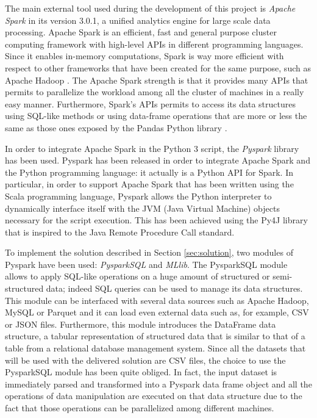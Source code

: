 The main external tool used during the development of this project is \textit{Apache Spark} \cite{spark-reference} in its version 3.0.1, a unified analytics engine for large scale data processing. Apache Spark is an efficient, fast and general purpose cluster computing framework with high-level APIs in different programming languages. Since it enables in-memory computations, Spark is way more efficient with respect to other frameworks that have been created for the same purpose, such as Apache Hadoop \cite{hadoop-reference}. The Apache Spark strength is that it provides many APIs that permits to parallelize the workload among all the cluster of machines in a really easy manner. Furthermore, Spark's APIs permits to access its data structures using SQL-like methods or using data-frame operations that are more or less the same as those ones exposed by the Pandas Python library \cite{python-pandas}.

In order to integrate Apache Spark in the Python 3 script, the \textit{Pyspark} library \cite{pyspark-reference} has been used. Pyspark has been released in order to integrate Apache Spark and the Python programming language: it actually is a Python API for Spark. In particular, in order to support Apache Spark that has been written using the Scala programming language, Pyspark allows the Python interpreter to dynamically interface itself with the JVM (Java Virtual Machine) objects necessary for the script execution. This has been achieved using the Py4J library \cite{py4j-reference} that is inspired to the Java Remote Procedure Call standard. 

\noindent To implement the solution described in Section \ref{sec:solution}, two modules of Pyspark have been used: \textit{PysparkSQL} and \textit{MLlib}. The PysparkSQL module allows to apply SQL-like operations on a huge amount of structured or semi-structured data; indeed SQL queries can be used to manage its data structures. This module can be interfaced with several data sources such as Apache Hadoop, MySQL or Parquet and it can load even external data such as, for example, CSV or JSON files. Furthermore, this module introduces the DataFrame data structure, a tabular representation of structured data that is similar to that of a table from a relational database management system. Since all the datasets that will be used with the delivered solution are CSV files, the choice to use the PysparkSQL module has been quite obliged. In fact, the input dataset is immediately parsed and transformed into a Pyspark data frame object and all the operations of data manipulation are executed on that data structure due to the fact that those operations can be parallelized among different machines.

